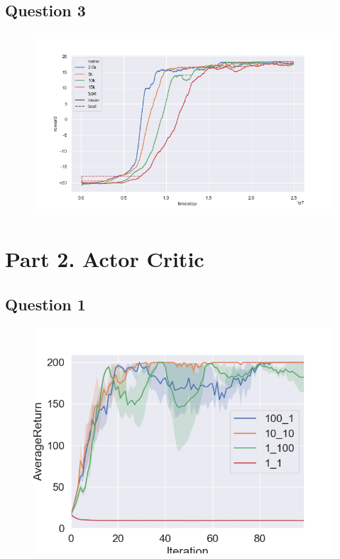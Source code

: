\documentclass[a4paper]{article}
\begin{document}
\subsection*{Question 3}
\begin{figure}[H]
\centering
\includegraphics[width=1\textwidth]{p1q3.png}
\end{figure}


\section*{Part 2. Actor Critic}
\subsection*{Question 1}
\begin{figure}[H]
\centering
\includegraphics[width=1\textwidth]{p2q1.png}
\end{figure}
\end{document}
